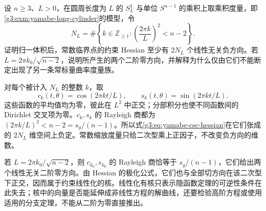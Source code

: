 \begin{exercise}\label{g3:ex:yamabe-product-negative-directions}
	设 \(n\ge3\)、\(L>0\)，在圆周长度为 \(L\) 的 \(S_L^1\) 与单位 \(S^{n-1}\) 的乘积上取乘积度量，即\cref{g3:exm:yamabe-long-cylinder}的模型，令
	\[
		N_L=\#\left\{k\in\mathbb Z_{\ge1}:
		\left(\frac{2\pi k}{L}\right)^2<n-2\right\}.
	\]
	证明归一体积后，常数临界点的约束 Hessian 至少有 \(2N_L\) 个线性无关负方向。若 \(L=2\pi k_0/\sqrt{n-2}\)，说明所产生的两个二阶零方向，并解释为什么仅由它们不能断定出现了另一条常标量曲率度量族。
\end{exercise}
\begin{solution}
	对每个被计入 \(N_L\) 的整数 \(k\)，取
	\[
		c_k(t,\theta)=\cos(2\pi kt/L),
		\qquad s_k(t,\theta)=\sin(2\pi kt/L).
	\]
	这些函数的平均值均为零，彼此在 \(L^2\) 中正交；分部积分也使不同函数间的 Dirichlet 交叉项为零。\(c_k,s_k\) 的 Rayleigh 商都为 \((2\pi k/L)^2<n-2=s_g/(n-1)\)。所以式\eqref{g3:eq:yamabe-csc-hessian}在它们张成的 \(2N_L\) 维空间上负定。常数缩放度量只给二次型乘上正因子，不改变负方向的维数。

	若 \(L=2\pi k_0/\sqrt{n-2}\)，则 \(c_{k_0},s_{k_0}\) 的 Rayleigh 商恰等于 \(s_g/(n-1)\)，它们给出两个线性无关二阶零方向。由 Hessian 的极化公式，它们也与全部切方向在该二次型下正交，因而属于约束线性化的核。线性化有核只表示隐函数定理的可逆性条件在此失去；核中的向量是否能延伸成非线性方程的解曲线，还要检验高阶方程或使用适用的分支定理，不能从二阶为零直接推出。
\end{solution}
